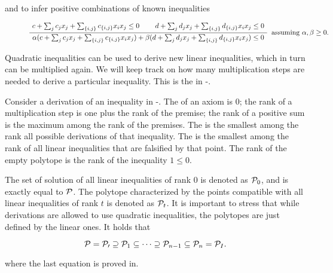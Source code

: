 \documentclass[a4paper,twoside,justified]{tufte-handout}
\begin{document}
and to infer positive combinations of known inequalities

\begin{figure*}
\begin{equation}
\RightLabel{\ assuming $\alpha, \beta \geq 0$.}
\AxiomC{$c+\sum_{j}c_{j} x_{j} + \sum_{\{i,j\}} c_{\{i,j\}}x_{i}x_{j}\leq 0$}
\AxiomC{$d+\sum_{j}d_{j} x_{j} + \sum_{\{i,j\}} d_{\{i,j\}}x_{i}x_{j}\leq 0$}
\BinaryInfC{%
$\alpha (c+\sum_{j}c_{j} x_{j} + \sum_{\{i,j\}} c_{\{i,j\}}x_{i}x_{j})+
\beta (d+\sum_{j}d_{j} x_{j} + \sum_{\{i,j\}} d_{\{i,j\}}x_{i}x_{j}) \leq 0$}
\DisplayProof
\end{equation}
\end{figure*}

Quadratic inequalities can be used to derive new linear inequalities,
which in turn can be multiplied again. We will keep track on how many
multiplication steps are needed to derive a particular
inequality. This is the  in
\Lovasz-\Schrijver.

\begin{definition}
  Consider a derivation of an inequality in \Lovasz-\Schrijver. The
   of an axiom is $ 0 $; the rank of
  a multiplication step is one plus the rank of the premise; the rank
  of a positive sum is the maximum among the rank of the premises.
  The  is the smallest among the
  rank all possible derivations of that inequality. The
   is the smallest among the rank of
  all linear inequalities that are falsified by that point. The rank
  of the empty polytope is the rank of the inequality $ 1 \leq 0 $.
\end{definition}

The set of solution of all linear inequalities of rank $ 0 $ is
denoted as $ \mathcal{P}_{0} $, and is exactly equal to $ \mathcal{P} $. The
polytope characterized by the points compatible with all linear
inequalities of rank $ t $ is denoted as $ \mathcal{P}_{t} $. It is
important to stress that while derivations are allowed to use
quadratic inequalities, the polytopes are just defined by the linear
ones. It holds that

\begin{equation}
  \mathcal{P}=\mathcal{P_{0}} \supseteq \mathcal{P}_{1} \subseteq \cdots
  \supseteq \mathcal{P}_{n-1} \subseteq \mathcal{P}_{n}=\mathcal{P}_{I}.
\end{equation}

where the last equation is proved in\cite{lovasz1991cones}.
\end{document}
